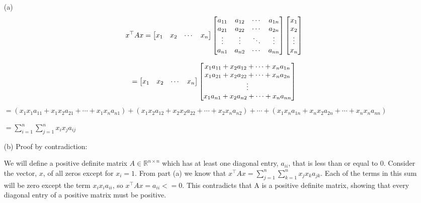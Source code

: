 \documentclass[11pt]{exam}
\theoremstyle{quest}
\begin{document}
\begin{itemize}
\item[(a)]
\begin{equation*}
x^\top A x = \begin{bmatrix}
  x_{1} & x_{2} & \cdots & x_{n} \\
\end{bmatrix}
\*
\begin{bmatrix}
  a_{11} & a_{12} & \cdots & a_{1n} \\
  a_{21} & a_{22} & \cdots & a_{2n} \\
  \vdots  & \vdots  & \ddots & \vdots  \\
  a_{n1} & a_{n2} & \cdots & a_{nn}
\end{bmatrix}
\*
\begin{bmatrix}
  x_{1} \\
  x_{2} \\
  \vdots \\
  x_{n}
\end{bmatrix}
\end{equation*}

\begin{equation*}
= \begin{bmatrix}
  x_{1} & x_{2} & \cdots & x_{n} \\
\end{bmatrix}
\*
\begin{bmatrix}
  x_{1}a_{11} + x_{2}a_{12} + \cdots + x_{n}a_{1n} \\
  x_{1}a_{21} + x_{2}a_{22} + \cdots + x_{n}a_{2n} \\
  \vdots  \\
  x_{1}a_{n1} + x_{2}a_{n2} + \cdots + x_{n}a_{nn}
\end{bmatrix}
\end{equation*}
$ = (x_{1}x_{1}a_{11} + x_{1}x_{2}a_{21} + \cdots + x_{1}x_{n}a_{n1}) + (x_{1}x_{2}a_{12} + x_{2}x_{2}a_{22} + \cdots + x_{2}x_{n}a_{n2}) + \cdots + (x_{1}x_{n}a_{1n} + x_{n}x_{2}a_{2n} + \cdots + x_{n}x_{n}a_{nn})
$

$= \sum_{i=1}^n\sum_{j=1}^n x_i x_j a_{ij}$

\item[(b)] 
Proof by contradiction:

We will define a positive definite matrix $A \in \mathbb{R}^{n \times n}$ which has at least one diagonal entry, $a_{ii}$, that is less than or equal to 0. Consider the vector, $x$, of all zeros except for $x_i = 1$. From part (a) we know that $x^\top A x = \sum_{j=1}^n\sum_{k=1}^n x_j x_k a_{jk}$.  Each of the terms in this sum will be zero except the term $x_i x_i a_{ii}$, so  $x^\top A x = a_{ii} <= 0$.  This contradicts that A is a positive definite matrix, showing that every diagonal entry of a positive matrix must be positive.

\end{itemize}
\end{document}
